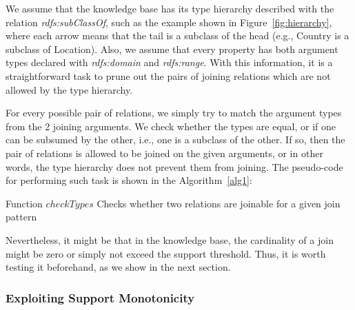 We assume that the knowledge base has its type hierarchy described with the relation \emph{rdfs:subClassOf}, such as
the example shown in Figure~\ref{fig:hierarchy}, where each arrow means that the tail is a subclass of the head (e.g.,
Country is a subclass of Location). Also, we assume that every property has both argument types declared with
\emph{rdfs:domain} and \emph{rdfs:range}. With this information, it is a straightforward task to prune out the pairs of
joining relations which are not allowed by
the type hierarchy.    

For every possible pair of relations, we simply try to match the argument types from the 2 joining arguments. We
check whether the types are equal, or if one can be subsumed by the other, i.e., one is a subclass of the other. If so,
then the pair of relations is allowed to be joined on the given arguments, or in other words, the type hierarchy
does not prevent them from joining. The pseudo-code for performing such task is shown in the Algorithm~\ref{alg1}:

\begin{algorithm}[h!]
  \caption{Function $checkTypes$ \newline Checks whether two relations are joinable for a given join pattern}
   {
  }
   {
  }
 \label{alg1}
\end{algorithm}

Nevertheless, it might be that in the knowledge base, the cardinality of a join might be zero or simply not exceed
the support threshold. Thus, it is worth testing it beforehand, as we show in the next section.

\subsubsection{Exploiting Support Monotonicity}

